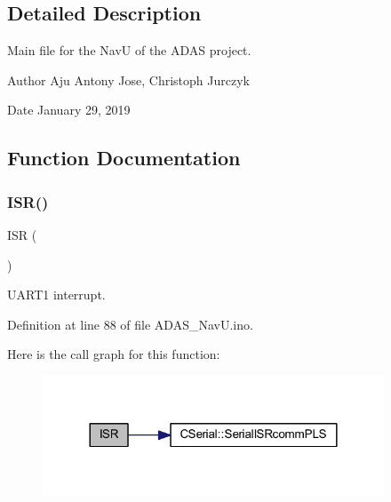 \subsection{Detailed Description}
Main file for the NavU of the A\+D\+AS project. 

\begin{DoxyAuthor}{Author}
Aju Antony Jose, Christoph Jurczyk 
\end{DoxyAuthor}
\begin{DoxyDate}{Date}
January 29, 2019 
\end{DoxyDate}


\subsection{Function Documentation}
\mbox{\label{_a_d_a_s___nav_u_8ino_ae6e8a8009a9ae0c59f25a496d1cf5a84}} 
\subsubsection{\texorpdfstring{I\+S\+R()}{ISR()}\hspace{0.1cm}{\footnotesize\ttfamily [1/2]}}
{\footnotesize\ttfamily I\+SR (\begin{DoxyParamCaption}\item[{U\+S\+A\+R\+T1\+\_\+\+R\+X\+\_\+vect}]{ }\end{DoxyParamCaption})}



U\+A\+R\+T1 interrupt. 



Definition at line 88 of file A\+D\+A\+S\+\_\+\+Nav\+U.\+ino.

Here is the call graph for this function\+:
\nopagebreak
\begin{figure}[H]
\begin{center}
\leavevmode
\includegraphics[width=288pt]{_a_d_a_s___nav_u_8ino_ae6e8a8009a9ae0c59f25a496d1cf5a84_cgraph}
\end{center}
\end{figure}
\mbox{\label{_a_d_a_s___nav_u_8ino_a63a86aad9ba2e355fe6380da553f554e}} 
